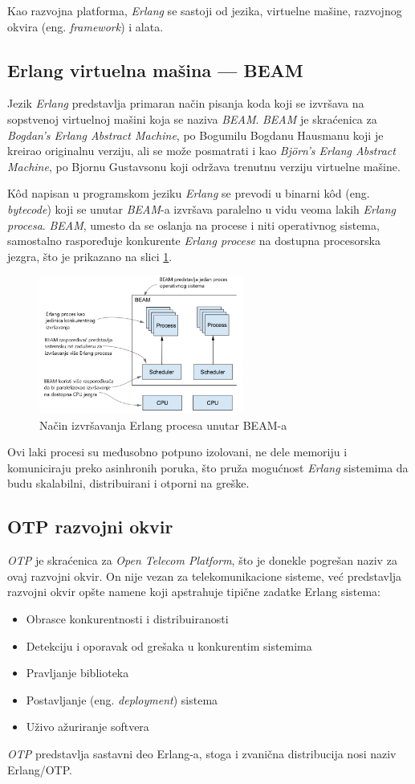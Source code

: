 \documentclass[12pt,oneside]{memoir}
\begin{document}
Kao razvojna platforma, \emph{Erlang} se sastoji od jezika, virtuelne mašine, razvojnog okvira (eng.
\emph{framework}) i alata.
\subsection{Erlang virtuelna mašina --- BEAM}
Jezik \emph{Erlang} predstavlja primaran način pisanja koda koji se izvršava na sopstvenoj virtuelnoj
mašini koja se naziva \emph{BEAM}. \emph{BEAM} je skraćenica za \emph{Bogdan’s Erlang Abstract Machine}, po
Bogumilu Bogdanu Hausmanu koji je kreirao originalnu verziju, ali se može posmatrati i kao
\emph{Björn’s Erlang Abstract Machine}, po Bjornu Gustavsonu koji održava trenutnu verziju 
virtuelne mašine. 

K\^{o}d napisan u programskom jeziku \emph{Erlang} se prevodi u binarni k\^{o}d (eng. \emph{bytecode})
koji se unutar \emph{BEAM}-a izvršava paralelno u vidu veoma lakih \emph{Erlang procesa}. \emph{BEAM}, umesto 
da se oslanja na procese i niti operativnog sistema, samostalno raspoređuje konkurente
\emph{Erlang procese} na dostupna procesorska jezgra, što je prikazano na slici \ref{fig:beam}.
\begin{figure}[h]
  \centering
  \includegraphics[width=0.6\textwidth]{beam.png}
  \caption{Način izvršavanja Erlang procesa unutar BEAM-a \cite{elixirInAction}}
  \label{fig:beam}
\end{figure}
Ovi laki procesi su međusobno potpuno izolovani, ne dele memoriju i komuniciraju preko
asinhronih poruka, što pruža mogućnost \emph{Erlang} sistemima da budu skalabilni, distribuirani i 
otporni na greške.  

\subsection{OTP razvojni okvir}
\emph{OTP} je skraćenica za \emph{Open Telecom Platform}, što je donekle pogrešan naziv za ovaj razvojni
okvir. On nije vezan za telekomunikacione sisteme, već predstavlja razvojni okvir opšte namene koji
apstrahuje tipične zadatke Erlang sistema:
\begin{itemize}
  \item Obrasce konkurentnosti i distribuiranosti
  \item Detekciju i oporavak od grešaka u konkurentim sistemima
  \item Pravljanje biblioteka
  \item Postavljanje (eng. \emph{deployment}) sistema
  \item Uživo ažuriranje softvera 
\end{itemize}
\emph{OTP} predstavlja sastavni deo Erlang-a, stoga i zvanična distribucija nosi naziv Erlang/OTP.
\end{document}
